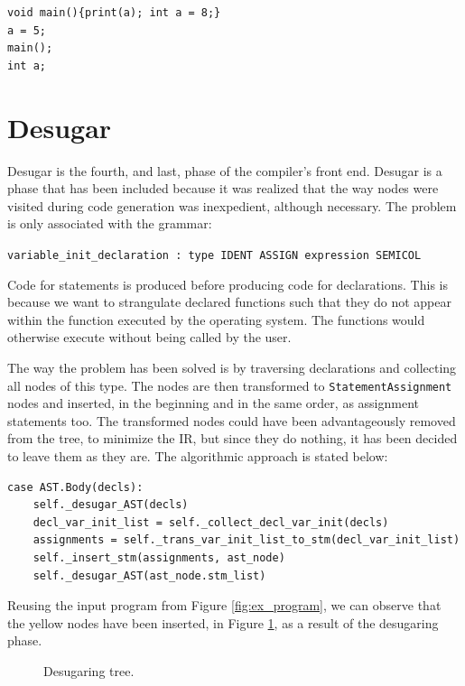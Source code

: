 \begin{verbatim}
void main(){print(a); int a = 8;}
a = 5;
main();
int a;
\end{verbatim}

\section{Desugar}\label{sec:desugar}
Desugar is the fourth, and last, phase of the compiler's front end. Desugar is a phase that has been included because it was realized that the way nodes were visited during code generation was inexpedient, although necessary. The problem is only associated with the grammar:

\begin{center}
\texttt{variable\_init\_declaration : type IDENT ASSIGN expression SEMICOL}
\end{center}

Code for statements is produced before producing code for declarations. This is because we want to strangulate declared functions such that they do not appear within the function executed by the operating system. The functions would otherwise execute without being called by the user.

The way the problem has been solved is by traversing declarations and collecting all nodes of this type. The nodes are then transformed to \texttt{StatementAssignment} nodes and inserted, in the beginning and in the same order, as assignment statements too. The transformed nodes could have been advantageously removed from the tree, to minimize the IR, but since they do nothing, it has been decided to leave them as they are. The algorithmic approach is stated below:

\begin{verbatim}
case AST.Body(decls):
    self._desugar_AST(decls)
    decl_var_init_list = self._collect_decl_var_init(decls)
    assignments = self._trans_var_init_list_to_stm(decl_var_init_list)
    self._insert_stm(assignments, ast_node)
    self._desugar_AST(ast_node.stm_list)
\end{verbatim}

Reusing the input program from Figure \ref{fig:ex_program}, we can observe that the yellow nodes have been inserted, in Figure \ref{fig:desugar}, as a result of the desugaring phase.

\begin{figure}[H]
    \centering
    
    \caption{Desugaring tree.} 
    \label{fig:desugar}
\end{figure}


